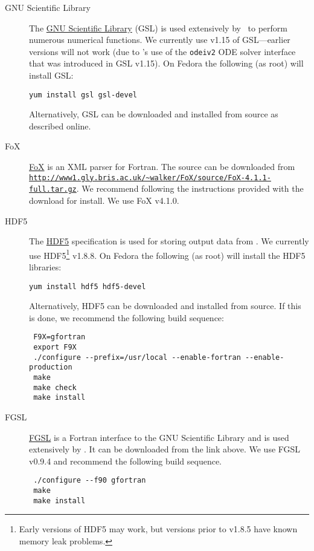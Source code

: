 \begin{description}
\item [GNU Scientific Library] The \href{http://www.gnu.org/software/gsl/}{GNU Scientific Library} (GSL) is used extensively by \glc\ to perform numerous numerical functions. We currently use v1.15 of GSL---earlier versions will not work (due to \glc's use of the {\tt odeiv2} ODE solver interface that was introduced in GSL v1.15). On Fedora the following (as root) will install GSL:
\begin{verbatim}
yum install gsl gsl-devel
\end{verbatim}
Alternatively, GSL can be downloaded and installed from source as described online.

\item [FoX] \href{http://uszla.me.uk/space/software/FoX/}{FoX} is an XML parser for Fortran. The source can be downloaded from \newline\href{http://www1.gly.bris.ac.uk/~walker/FoX/source/FoX-4.1.1-full.tar.gz}{\tt http://www1.gly.bris.ac.uk/\textasciitilde{}walker/FoX/source/FoX-4.1.1-full.tar.gz}. We recommend following the instructions provided with the download for install. We use FoX v4.1.0.

\item [HDF5] The \href{http://www.hdfgroup.org/HDF5/}{HDF5} specification is used for storing output data from \glc. We currently use HDF5\footnote{Early versions of HDF5 may work, but versions prior to v1.8.5 have known memory leak problems.} v1.8.8. On Fedora the following (as root) will install the HDF5 libraries:
\begin{verbatim}
yum install hdf5 hdf5-devel
\end{verbatim}
Alternatively, HDF5 can be downloaded and installed from source. If this is done, we recommend the following build sequence:
\begin{verbatim}
 F9X=gfortran
 export F9X
 ./configure --prefix=/usr/local --enable-fortran --enable-production
 make
 make check
 make install
\end{verbatim}

\item [FGSL] \href{http://www.lrz-muenchen.de/services/software/mathematik/gsl/fortran/}{FGSL} is a Fortran interface to the GNU Scientific Library and is used extensively by \glc. It can be downloaded from the link above. We use FGSL v0.9.4 and recommend the following build sequence. 
\begin{verbatim}
 ./configure --f90 gfortran
 make
 make install
\end{verbatim}


\end{description}
